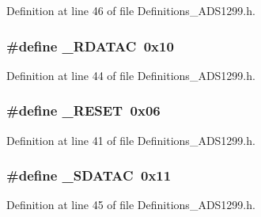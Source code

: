 Definition at line 46 of file Definitions\+\_\+\+A\+D\+S1299.\+h.

\subsubsection[{\texorpdfstring{\+\_\+\+R\+D\+A\+T\+AC}{_RDATAC}}]{\setlength{\rightskip}{0pt plus 5cm}\#define \+\_\+\+R\+D\+A\+T\+AC~0x10}\hypertarget{group__Definitions__ADS1299_gab1c685ad3f69a4c28f19b19a13c725d0}{}\label{group__Definitions__ADS1299_gab1c685ad3f69a4c28f19b19a13c725d0}


Definition at line 44 of file Definitions\+\_\+\+A\+D\+S1299.\+h.

\subsubsection[{\texorpdfstring{\+\_\+\+R\+E\+S\+ET}{_RESET}}]{\setlength{\rightskip}{0pt plus 5cm}\#define \+\_\+\+R\+E\+S\+ET~0x06}\hypertarget{group__Definitions__ADS1299_gae0b867da2bcc6a8910ba93baec7380ec}{}\label{group__Definitions__ADS1299_gae0b867da2bcc6a8910ba93baec7380ec}


Definition at line 41 of file Definitions\+\_\+\+A\+D\+S1299.\+h.

\subsubsection[{\texorpdfstring{\+\_\+\+S\+D\+A\+T\+AC}{_SDATAC}}]{\setlength{\rightskip}{0pt plus 5cm}\#define \+\_\+\+S\+D\+A\+T\+AC~0x11}\hypertarget{group__Definitions__ADS1299_ga4f962a0b8818881f4dd33aeb8dedd5b2}{}\label{group__Definitions__ADS1299_ga4f962a0b8818881f4dd33aeb8dedd5b2}


Definition at line 45 of file Definitions\+\_\+\+A\+D\+S1299.\+h.

